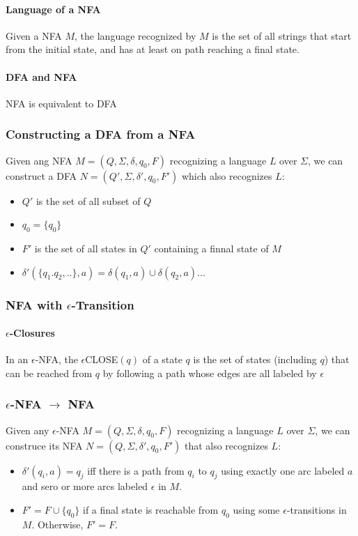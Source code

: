 \documentclass[titlepage]{article}
\begin{document}
            \paragraph{Language of a NFA}
            Given a NFA $M$, the language recognized by $M$ is the set of all strings that start from the initial state, and has at least on path reaching a final state.
            \paragraph{DFA and NFA}
            NFA is equivalent to DFA
        \subsubsection*{Constructing a DFA from a NFA}
        Given ang NFA $M=(Q,\Sigma,\delta,q_0,F)$ recognizing a language $L$ over $\Sigma$, we can construct a DFA $N=(Q',\Sigma,\delta',q_0,F')$ which also recognizes $L$:
        \begin{itemize}
            \item $Q'$ is the set of all subset of $Q$
            \item $q_0=\{q_0\}$
            \item $F'$ is the set of all states in $Q'$ containing a finnal state of $M$
            \item $\delta'(\{q_1.q_2,..\},a)=\delta(q_1,a)\cup\delta(q_2,a)...$
        \end{itemize}
        \subsubsection*{NFA with $\epsilon$-Transition}
        \paragraph{$\epsilon$-Closures}
        In an $\epsilon$-NFA, the $\epsilon$CLOSE$(q)$ of a state $q$ is the set of states (including $q$) that can be reached from $q$ by following a path whose edges are all labeled by $\epsilon$
        \subsubsection*{$\epsilon$-NFA $\rightarrow$ NFA}
        Given any $\epsilon$-NFA $M=(Q,\Sigma,\delta,q_0,F)$ recognizing a language $L$ over $\Sigma$, we can construce its NFA $N=(Q,\Sigma,\delta',q_0,F')$ that also recognizes $L$:
        \begin{itemize}
            \item $\delta'(q_i,a)=q_j$ iff there is a path from $q_i$ to $q_j$ using exactly one arc labeled $a$ and sero or more arcs labeled $\epsilon$ in $M$.
            \item $F'=F\cup\{q_0\}$ if a final state is reachable from $q_0$ using some $\epsilon$-transitions in $M$. Otherwise, $F'=F$.
        \end{itemize}
\end{document}
